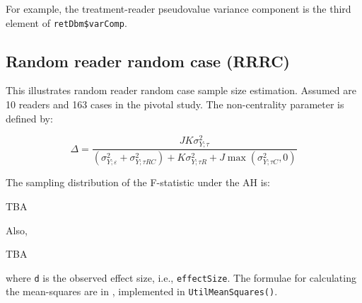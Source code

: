 \documentclass[]{book}
\newenvironment{Shaded}{\begin{snugshade}}{\end{snugshade}}
\newcommand{\CommentTok}[1]{\textcolor[rgb]{0.56,0.35,0.01}{\textit{#1}}}
\newcommand{\NormalTok}[1]{#1}
\newcommand{\OperatorTok}[1]{\textcolor[rgb]{0.81,0.36,0.00}{\textbf{#1}}}
\begin{document}
\begin{Shaded}
\end{Shaded}

For example, the treatment-reader pseudovalue variance component is the third element of \texttt{retDbm\$varComp}.

\hypertarget{random-reader-random-case-rrrc}{%
\subsection{Random reader random case (RRRC)}\label{random-reader-random-case-rrrc}}

This illustrates random reader random case sample size estimation. Assumed are 10 readers and 163 cases in the pivotal study. The non-centrality parameter is defined by:

\[\Delta =\frac{JK\sigma _{Y;\tau }^{2}}{\left( \sigma _{Y;\varepsilon }^{2}+\sigma _{Y;\tau RC}^{2} \right)+K\sigma _{Y;\tau R}^{2}+J\max \left( \sigma _{Y;\tau C}^{2},0 \right)}\]

The sampling distribution of the F-statistic under the AH is:

TBA

Also,

TBA

where \texttt{d} is the observed effect size, i.e., \texttt{effectSize}. The formulae for calculating the mean-squares are in \citep{RN1476}, implemented in \texttt{UtilMeanSquares()}.
\end{document}
